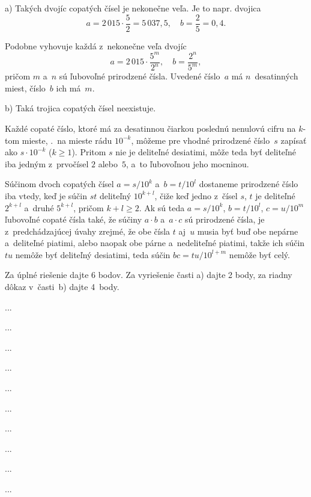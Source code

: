 {%
a) Takých dvojíc copatých čísel je nekonečne veľa. Je to napr. dvojica
$$
a=2\,015\cdot\frac{5}{2}=5\,037{,}5, \quad b=\frac{2}{5}=0{,}4.
$$

Podobne vyhovuje každá z~nekonečne veľa dvojíc
$$
a=2\,015\cdot\frac{5^m}{2^n},\quad b=\frac{2^n}{5^m},
$$
pričom $m$ a~$n$ sú ľubovoľné prirodzené čísla. Uvedené číslo~$a$
má $n$~desatinných miest, číslo~$b$ ich má~$m$.

\smallskip
b) Taká trojica copatých čísel neexistuje.

Každé copaté číslo, ktoré má za desatinnou čiarkou poslednú
nenulovú cifru na $k$-tom mieste, \tj.~na mieste rádu $10^{-k}$,
môžeme pre vhodné prirodzené číslo~$s$ zapísať
ako ${s\cdot10^{-k}}$ ($k\ge1$). Pritom $s$ nie je deliteľné desiatimi,
môže teda byť deliteľné iba jedným z~prvočísel $2$ alebo~$5$, a~to
ľubovoľnou jeho mocninou.

Súčinom dvoch copatých čísel $a=s/10^k$ a~$b=t/10^l$ dostaneme
prirodzené číslo iba vtedy, keď je súčin $st$ deliteľný $10^{k+l}$,
čiže keď jedno z~čísel $s$, $t$ je deliteľné $2^{k+l}$ a~druhé
$5^{k+l}$, pričom $k+l\ge2$. Ak sú teda $a=s/10^k$, $b=t/10^l$,
$c=u/10^m$ ľubovoľné copaté čísla také, že súčiny $a\cdot b$
a~$a\cdot c$ sú prirodzené čísla, je z~predchádzajúcej úvahy zrejmé, že obe
čísla $t$ aj~$u$ musia byť buď obe nepárne a~deliteľné piatimi, alebo naopak
obe párne a~nedeliteľné piatimi, takže ich súčin $tu$ nemôže byť
deliteľný desiatimi, teda súčin $bc=tu/10^{l+m}$ nemôže byť celý.



\nobreak\medskip\petit\noindent
Za úplné riešenie dajte 6 bodov.
Za vyriešenie časti a) dajte 2 body, za riadny dôkaz
v~časti~b) dajte 4~body.

\endpetit
\bigbreak
}

{%
...}

{%
...}

{%
...}

{%
...}

{%
...}

{%
...}

{%
...}

{%
...}

{%
...}

{%
...}

